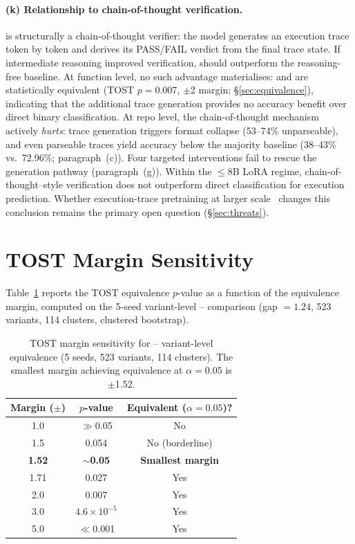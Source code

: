 \paragraph{(k) Relationship to chain-of-thought verification.}
\cwm{} is structurally a chain-of-thought verifier: the model generates an execution trace token by token and derives its PASS/FAIL verdict from the final trace state. If intermediate reasoning improved verification, \cwm{} should outperform the reasoning-free \cls{} baseline. At function level, no such advantage materialises: \cwm{} and \cls{} are statistically equivalent (TOST $p{=}0.007$, $\pm$2\pp{} margin; \S\ref{sec:equivalence}), indicating that the additional trace generation provides no accuracy benefit over direct binary classification. At repo level, the chain-of-thought mechanism actively \emph{hurts}: trace generation triggers format collapse (53--74\% unparseable), and even parseable traces yield accuracy below the majority baseline (38--43\% vs.\ 72.96\%; paragraph~(c)). Four targeted interventions fail to rescue the generation pathway (paragraph~(g)). Within the ${\leq}$8B LoRA regime, chain-of-thought--style verification does not outperform direct classification for execution prediction. Whether execution-trace pretraining at larger scale~\cite{meta2025cwm} changes this conclusion remains the primary open question (\S\ref{sec:threats}).

\section{TOST Margin Sensitivity}
\label{app:tost_sensitivity}

Table~\ref{tab:tost_sensitivity} reports the TOST equivalence $p$-value as a function of the equivalence margin, computed on the 5-seed variant-level \cls{}--\cwm{} comparison (gap $= 1.24$\pp{}, 523 variants, 114 clusters, clustered bootstrap).

\begin{table}[h]
\centering
\small
\caption{TOST margin sensitivity for \cls{}--\cwm{} variant-level equivalence (5 seeds, 523 variants, 114 clusters). The smallest margin achieving equivalence at $\alpha = 0.05$ is $\pm$1.52\pp{}.}
\label{tab:tost_sensitivity}
\setlength{\tabcolsep}{4pt}
\begin{tabular}{ccc}
\toprule
\textbf{Margin ($\pm$\pp{})} & \textbf{$p$-value} & \textbf{Equivalent ($\alpha{=}0.05$)?} \\
\midrule
1.0 & $\gg$0.05 & No \\
1.5 & 0.054 & No (borderline) \\
\textbf{1.52} & ${\sim}$\textbf{0.05} & \textbf{Smallest margin} \\
1.71 & 0.027 & Yes \\
2.0 & 0.007 & Yes \\
3.0 & $4.6{\times}10^{-5}$ & Yes \\
5.0 & $\ll$0.001 & Yes \\
\bottomrule
\end{tabular}
\end{table}

